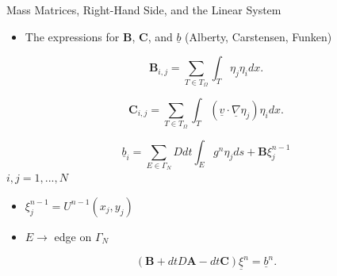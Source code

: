 \documentclass[10pt]{beamer}
\begin{document}
\begin{frame}{ Mass Matrices, Right-Hand Side, and the Linear System} \label{MassmatRHSLinearSystem}
\begin{itemize}
\item The expressions for $\mathbf{B}$, $\mathbf{C}$, and $\underline{b}$  (Alberty, Carstensen, Funken)
\end{itemize}

\begin{equation}
\mathbf{B}_{i,j} = \sum_{T \in T_{\Omega}} \int_{T} \eta_{j}\eta_{i} dx.
\end{equation}

\begin{equation}
\mathbf{C}_{i,j} = \sum_{T \in T_{\Omega}}\int_{T}\left(\underline{v}\cdot \underline{\nabla}\eta_{j}\right)\eta_{i} dx.
\end{equation}

\begin{equation}
\underline{b}_{i}= \sum_{E \in \Gamma_{N}} Ddt\int_{E}g^{n}\eta_{j}ds+\mathbf{B}\xi_{j}^{n-1}
\end{equation}
 $i,j=1,...,N$
\begin{itemize}
\item $\xi_{j}^{n-1} = U^{n-1}\left(x_{j},y_{j}\right)$
\item $E \rightarrow$ edge on $\Gamma_{N}$
\end{itemize}
\begin{equation}
\left(\mathbf{B}+dtD\mathbf{A}-dt\mathbf{C}\right)\underline{\xi}^{n}=\underline{b}^{n}.
\end{equation}
\hyperlink{Questions}{}
\end{frame}
\end{document}
